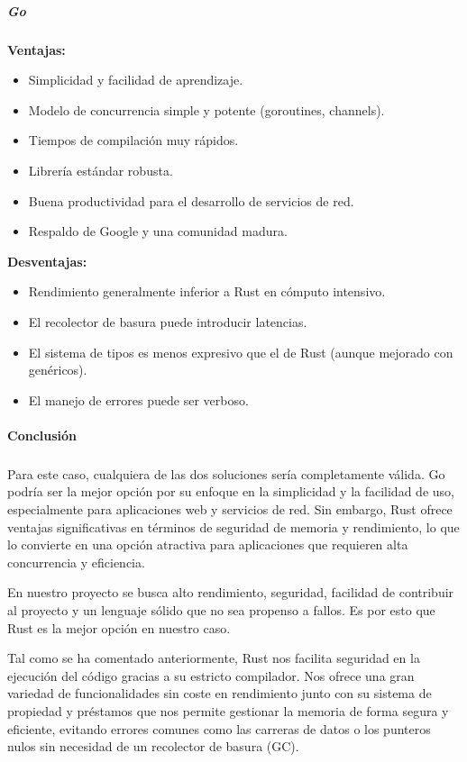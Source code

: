 \subparagraph{Go}
\textbf{Ventajas:}
\begin{itemize}
    \item Simplicidad y facilidad de aprendizaje.
    \item Modelo de concurrencia simple y potente (goroutines, channels).
    \item Tiempos de compilación muy rápidos.
    \item Librería estándar robusta.
    \item Buena productividad para el desarrollo de servicios de red.
    \item Respaldo de Google y una comunidad madura.
\end{itemize}
\textbf{Desventajas:}
\begin{itemize}
    \item Rendimiento generalmente inferior a Rust en cómputo intensivo.
    \item El recolector de basura puede introducir latencias.
    \item El sistema de tipos es menos expresivo que el de Rust (aunque mejorado con genéricos).
    \item El manejo de errores puede ser verboso.
\end{itemize}

\paragraph{Conclusión}
\subparagraph{}
Para este caso, cualquiera de las dos soluciones sería completamente válida. Go podría ser la mejor opción por su enfoque en la simplicidad y la facilidad de uso, especialmente para aplicaciones web y servicios de red. Sin embargo, Rust ofrece ventajas significativas en términos de seguridad de memoria y rendimiento, lo que lo convierte en una opción atractiva para aplicaciones que requieren alta concurrencia y eficiencia.

En nuestro proyecto se busca alto rendimiento, seguridad, facilidad de contribuir al proyecto y un lenguaje sólido que no sea propenso a fallos.
Es por esto que Rust es la mejor opción en nuestro caso.

Tal como se ha comentado anteriormente, Rust nos facilita seguridad en la ejecución del código gracias a su estricto compilador.
Nos ofrece una gran variedad de funcionalidades sin coste en rendimiento junto con su sistema de propiedad y préstamos que nos permite gestionar la memoria de forma segura y eficiente, evitando errores comunes como las carreras de datos o los punteros nulos sin necesidad de un recolector de basura (GC).


